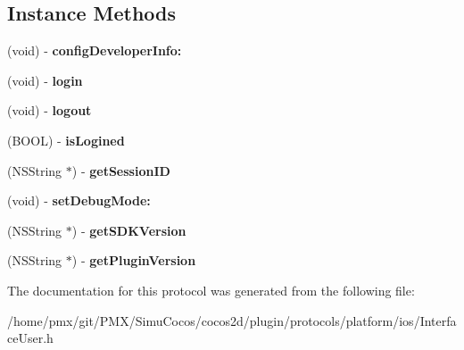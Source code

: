 \subsection*{Instance Methods}
\begin{DoxyCompactItemize}
\item 
\mbox{\label{protocolInterfaceUser_01-p_a694736e877b6282ec5fed09f39cb6c48}} 
(void) -\/ {\bfseries config\+Developer\+Info\+:}
\item 
\mbox{\label{protocolInterfaceUser_01-p_ad38514de361222e6cbcfe55027487e90}} 
(void) -\/ {\bfseries login}
\item 
\mbox{\label{protocolInterfaceUser_01-p_abe57cd18690a59306ce1761e01d42b6b}} 
(void) -\/ {\bfseries logout}
\item 
\mbox{\label{protocolInterfaceUser_01-p_a3280f96b5d141e0c8ac5d94b1eca5f20}} 
(B\+O\+OL) -\/ {\bfseries is\+Logined}
\item 
\mbox{\label{protocolInterfaceUser_01-p_a3fe46af1d60b77279c7c0b4e824db9bc}} 
(N\+S\+String $\ast$) -\/ {\bfseries get\+Session\+ID}
\item 
\mbox{\label{protocolInterfaceUser_01-p_a10f84aff331c45ec7de0961d34816508}} 
(void) -\/ {\bfseries set\+Debug\+Mode\+:}
\item 
\mbox{\label{protocolInterfaceUser_01-p_a7dbbebce194feb808a5bfbae4db71ca3}} 
(N\+S\+String $\ast$) -\/ {\bfseries get\+S\+D\+K\+Version}
\item 
\mbox{\label{protocolInterfaceUser_01-p_a0a57e5430d6fae7dde3220579d5ab3a1}} 
(N\+S\+String $\ast$) -\/ {\bfseries get\+Plugin\+Version}
\end{DoxyCompactItemize}


The documentation for this protocol was generated from the following file\+:\begin{DoxyCompactItemize}
\item 
/home/pmx/git/\+P\+M\+X/\+Simu\+Cocos/cocos2d/plugin/protocols/platform/ios/Interface\+User.\+h\end{DoxyCompactItemize}
